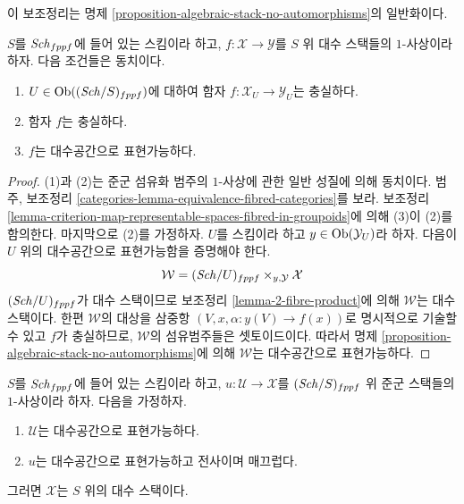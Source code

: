 \noindent
이 보조정리는 명제
\ref{proposition-algebraic-stack-no-automorphisms}의 일반화이다.

\begin{lemma}
\label{lemma-characterize-representable-by-algebraic-spaces}
$S$를 $\mathit{Sch}_{fppf}$에 들어 있는 스킴이라 하고,
$f : \mathcal{X} \to \mathcal{Y}$를 $S$ 위 대수 스택들의 $1$-사상이라
하자. 다음 조건들은 동치이다.
\begin{enumerate}
\item $U \in \mathop{\mathrm{Ob}}\nolimits((\mathit{Sch}/S)_{fppf})$에 대하여 함자
$f : \mathcal{X}_U \to \mathcal{Y}_U$는 충실하다.
\item 함자 $f$는 충실하다.
\item $f$는 대수공간으로 표현가능하다.
\end{enumerate}
\end{lemma}

\begin{proof}
(1)과 (2)는 준군 섬유화 범주의 $1$-사상에 관한 일반 성질에 의해
동치이다. 범주, 보조정리
\ref{categories-lemma-equivalence-fibred-categories}를 보라. 보조정리
\ref{lemma-criterion-map-representable-spaces-fibred-in-groupoids}에 의해
(3)이 (2)를 함의한다. 마지막으로 (2)를 가정하자. $U$를 스킴이라 하고
$y \in \mathop{\mathrm{Ob}}\nolimits(\mathcal{Y}_U)$라 하자. 다음이 $U$ 위의 대수공간으로
표현가능함을 증명해야 한다.
$$
\mathcal{W} = (\mathit{Sch}/U)_{fppf} \times_{y, \mathcal{Y}} \mathcal{X}
$$
$(\mathit{Sch}/U)_{fppf}$가 대수 스택이므로 보조정리
\ref{lemma-2-fibre-product}에 의해 $\mathcal{W}$는 대수 스택이다.
한편 $\mathcal{W}$의 대상을 삼중항
$(V, x, \alpha : y(V) \to f(x))$로 명시적으로 기술할 수 있고 $f$가
충실하므로, $\mathcal{W}$의 섬유범주들은 셋토이드이다. 따라서 명제
\ref{proposition-algebraic-stack-no-automorphisms}에 의해 $\mathcal{W}$는
대수공간으로 표현가능하다.
\end{proof}

\begin{lemma}
\label{lemma-smooth-surjective-morphism-implies-algebraic}
$S$를 $\mathit{Sch}_{fppf}$에 들어 있는 스킴이라 하고,
$u : \mathcal{U} \to \mathcal{X}$를 $(\mathit{Sch}/S)_{fppf}$ 위 준군 스택들의
$1$-사상이라 하자. 다음을 가정하자.
\begin{enumerate}
\item $\mathcal{U}$는 대수공간으로 표현가능하다.
\item $u$는 대수공간으로 표현가능하고 전사이며 매끄럽다.
\end{enumerate}
그러면 $\mathcal X$는 $S$ 위의 대수 스택이다.
\end{lemma}

